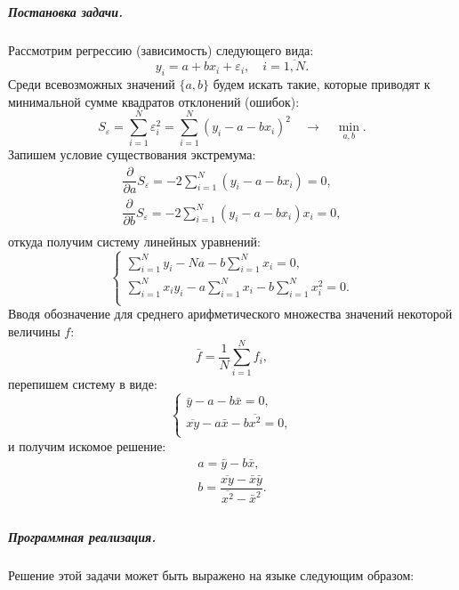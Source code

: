 \subparagraph{Постановка задачи.}
Рассмотрим регрессию (зависимость) следующего вида:
\begingroup
\newcommand{\SumN}{\ensuremath{\sum\limits_{i=1}^{N}}}
\[
  y_i = a + b x_i + \varepsilon_i,\quad i = \overline{1, N}.
\]
Среди всевозможных значений \(\{ a, b \}\) будем искать такие, которые приводят к минимальной сумме квадратов отклонений (ошибок):
\[
  S_{\varepsilon} = \SumN \varepsilon_i^2 = \SumN (y_i - a - b x_i)^2\quad\rightarrow\quad \min\limits_{a, b}.
\]
Запишем условие существования экстремума:
\[
\begin{array}{l}
  \dfrac{\partial}{\partial a} S_{\varepsilon} = -2 \SumN (y_i - a - b x_i) = 0, \\[2ex]
  \dfrac{\partial}{\partial b} S_{\varepsilon} = -2 \SumN (y_i - a - b x_i) x_i = 0, \\
\end{array}
\]
откуда получим систему линейных уравнений:
\[
\left\{ \begin{array}{l}
        \SumN y_i - N a - b\SumN x_i = 0, \\[2ex]
        \SumN x_i y_i - a\SumN x_i - b\SumN x_i^2 = 0. \\
        \end{array} \right.
\]
Вводя обозначение для среднего арифметического множества значений некоторой величины \(f\):
\[
  \bar f = \dfrac{1}{N}\SumN f_i,
\]
перепишем систему в виде:
\[
\left\{ \begin{array}{l}
        \bar y - a - b\bar x = 0, \\
        \overline{x y} - a\bar x - b\overline{x^2} = 0, \\
        \end{array} \right.
\]
и получим искомое решение:
\[
\boxed{\begin{array}{l}
       a = \bar y - b\bar x, \\
       b = \dfrac{\overline{x y} - \bar x\bar y}{\overline{x^2} - \bar x^2}. \\
       \end{array}}
\]
\endgroup



\subparagraph{Программная реализация.}
Решение этой задачи может быть выражено на языке  следующим образом:\label{code:lsm}





